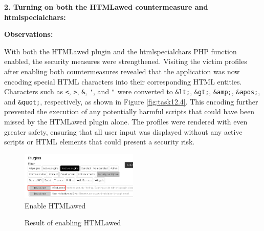 \documentclass[a4paper,11pt]{article}
\begin{document}
\textbf{2. Turning on both the HTMLawed countermeasure and htmlspecialchars:}

\textbf{Observations:}

With both the HTMLawed plugin and the htmlspecialchars PHP function enabled, the security measures were strengthened. Visiting the victim profiles after enabling both countermeasures revealed that the application was now encoding special HTML characters into their corresponding HTML entities. Characters such as \verb|<|, \verb|>|, \verb|&|, \verb|'|, and \verb|"| were converted to \verb|&lt;|, \verb|&gt;|, \verb|&amp;|, \verb|&apos;|, and \verb|&quot;|, respectively, as shown in Figure \ref{fig:task12.4}. This encoding further prevented the execution of any potentially harmful scripts that could have been missed by the HTMLawed plugin alone. The profiles were rendered with even greater safety, ensuring that all user input was displayed without any active scripts or HTML elements that could present a security risk.

\begin{figure}[h]
    \centering
       \includegraphics[width=0.5\textwidth]{figures/task12/task12.1.png}
    \caption{Enable HTMLawed}\label{fig:task12.1}
\end{figure}

\begin{figure}[h]
    \centering
    \hfill
    \hfill
    \caption{Result of enabling HTMLawed}\label{fig:task12-1}
\end{figure}
\end{document}
